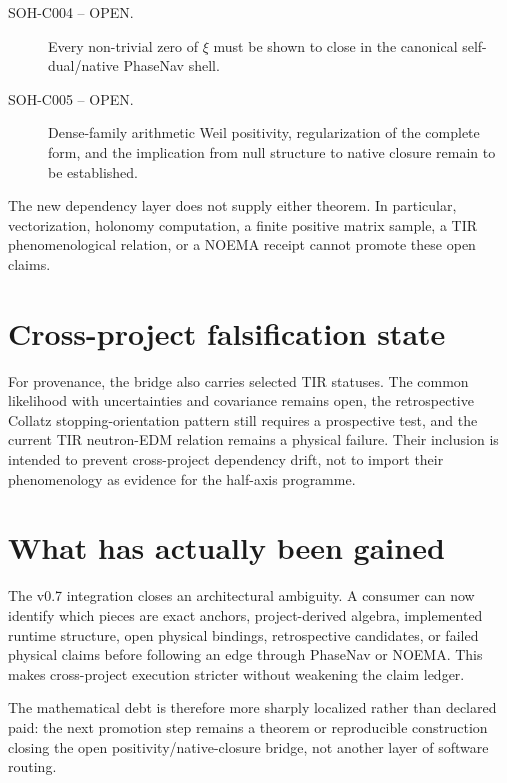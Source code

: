 \begin{description}
  \item[SOH-C004 -- OPEN.] Every non-trivial zero of $\xi$ must be shown to
  close in the canonical self-dual/native PhaseNav shell.

  \item[SOH-C005 -- OPEN.] Dense-family arithmetic Weil positivity,
  regularization of the complete form, and the implication from null structure
  to native closure remain to be established.
\end{description}

The new dependency layer does not supply either theorem.  In particular,
vectorization, holonomy computation, a finite positive matrix sample, a TIR
phenomenological relation, or a NOEMA receipt cannot promote these open claims.

\section{Cross-project falsification state}

For provenance, the bridge also carries selected TIR statuses.  The common
likelihood with uncertainties and covariance remains open, the retrospective
Collatz stopping-orientation pattern still requires a prospective test, and the
current TIR neutron-EDM relation remains a physical failure.  Their inclusion is
intended to prevent cross-project dependency drift, not to import their
phenomenology as evidence for the half-axis programme.

\section{What has actually been gained}

The v0.7 integration closes an architectural ambiguity.  A consumer can now
identify which pieces are exact anchors, project-derived algebra, implemented
runtime structure, open physical bindings, retrospective candidates, or failed
physical claims before following an edge through PhaseNav or NOEMA.  This makes
cross-project execution stricter without weakening the claim ledger.

The mathematical debt is therefore more sharply localized rather than declared
paid: the next promotion step remains a theorem or reproducible construction
closing the open positivity/native-closure bridge, not another layer of software
routing.
